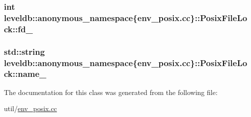 \subsubsection[{fd\+\_\+}]{\setlength{\rightskip}{0pt plus 5cm}int leveldb\+::anonymous\+\_\+namespace\{env\+\_\+posix.\+cc\}\+::Posix\+File\+Lock\+::fd\+\_\+}\label{classleveldb_1_1anonymous__namespace_02env__posix_8cc_03_1_1_posix_file_lock_a06cde7d88323d828d9b79ce42e36c879}
\hypertarget{classleveldb_1_1anonymous__namespace_02env__posix_8cc_03_1_1_posix_file_lock_a39f55651895580870b1e26550321a1c9}{}
\subsubsection[{name\+\_\+}]{\setlength{\rightskip}{0pt plus 5cm}std\+::string leveldb\+::anonymous\+\_\+namespace\{env\+\_\+posix.\+cc\}\+::Posix\+File\+Lock\+::name\+\_\+}\label{classleveldb_1_1anonymous__namespace_02env__posix_8cc_03_1_1_posix_file_lock_a39f55651895580870b1e26550321a1c9}


The documentation for this class was generated from the following file\+:\begin{DoxyCompactItemize}
\item 
util/\hyperlink{env__posix_8cc}{env\+\_\+posix.\+cc}\end{DoxyCompactItemize}
